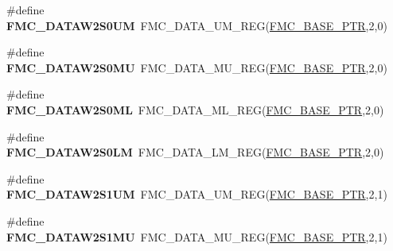 \begin{DoxyCompactItemize}
\item 
\hypertarget{group___f_m_c___register___accessor___macros_gac00fa366ca4f77e6f59ad9dde014c26d}{}\#define {\bfseries F\+M\+C\+\_\+\+D\+A\+T\+A\+W2\+S0\+U\+M}~F\+M\+C\+\_\+\+D\+A\+T\+A\+\_\+\+U\+M\+\_\+\+R\+E\+G(\hyperlink{group___f_m_c___peripheral_ga0a740437b573e32e6b932bf729485fd9}{F\+M\+C\+\_\+\+B\+A\+S\+E\+\_\+\+P\+T\+R},2,0)\label{group___f_m_c___register___accessor___macros_gac00fa366ca4f77e6f59ad9dde014c26d}

\item 
\hypertarget{group___f_m_c___register___accessor___macros_ga4e03f60fd7f774927f55089ee49acd8e}{}\#define {\bfseries F\+M\+C\+\_\+\+D\+A\+T\+A\+W2\+S0\+M\+U}~F\+M\+C\+\_\+\+D\+A\+T\+A\+\_\+\+M\+U\+\_\+\+R\+E\+G(\hyperlink{group___f_m_c___peripheral_ga0a740437b573e32e6b932bf729485fd9}{F\+M\+C\+\_\+\+B\+A\+S\+E\+\_\+\+P\+T\+R},2,0)\label{group___f_m_c___register___accessor___macros_ga4e03f60fd7f774927f55089ee49acd8e}

\item 
\hypertarget{group___f_m_c___register___accessor___macros_ga51ded89a0e3f06a4383d0d27815e0c63}{}\#define {\bfseries F\+M\+C\+\_\+\+D\+A\+T\+A\+W2\+S0\+M\+L}~F\+M\+C\+\_\+\+D\+A\+T\+A\+\_\+\+M\+L\+\_\+\+R\+E\+G(\hyperlink{group___f_m_c___peripheral_ga0a740437b573e32e6b932bf729485fd9}{F\+M\+C\+\_\+\+B\+A\+S\+E\+\_\+\+P\+T\+R},2,0)\label{group___f_m_c___register___accessor___macros_ga51ded89a0e3f06a4383d0d27815e0c63}

\item 
\hypertarget{group___f_m_c___register___accessor___macros_ga6d06a694a009c279a2468bdeaae89f9a}{}\#define {\bfseries F\+M\+C\+\_\+\+D\+A\+T\+A\+W2\+S0\+L\+M}~F\+M\+C\+\_\+\+D\+A\+T\+A\+\_\+\+L\+M\+\_\+\+R\+E\+G(\hyperlink{group___f_m_c___peripheral_ga0a740437b573e32e6b932bf729485fd9}{F\+M\+C\+\_\+\+B\+A\+S\+E\+\_\+\+P\+T\+R},2,0)\label{group___f_m_c___register___accessor___macros_ga6d06a694a009c279a2468bdeaae89f9a}

\item 
\hypertarget{group___f_m_c___register___accessor___macros_gae65011d2add3a4d4d7c3cf197d7429b4}{}\#define {\bfseries F\+M\+C\+\_\+\+D\+A\+T\+A\+W2\+S1\+U\+M}~F\+M\+C\+\_\+\+D\+A\+T\+A\+\_\+\+U\+M\+\_\+\+R\+E\+G(\hyperlink{group___f_m_c___peripheral_ga0a740437b573e32e6b932bf729485fd9}{F\+M\+C\+\_\+\+B\+A\+S\+E\+\_\+\+P\+T\+R},2,1)\label{group___f_m_c___register___accessor___macros_gae65011d2add3a4d4d7c3cf197d7429b4}

\item 
\hypertarget{group___f_m_c___register___accessor___macros_gaf1774bd2af301b6b5aecdef6d68eba34}{}\#define {\bfseries F\+M\+C\+\_\+\+D\+A\+T\+A\+W2\+S1\+M\+U}~F\+M\+C\+\_\+\+D\+A\+T\+A\+\_\+\+M\+U\+\_\+\+R\+E\+G(\hyperlink{group___f_m_c___peripheral_ga0a740437b573e32e6b932bf729485fd9}{F\+M\+C\+\_\+\+B\+A\+S\+E\+\_\+\+P\+T\+R},2,1)\label{group___f_m_c___register___accessor___macros_gaf1774bd2af301b6b5aecdef6d68eba34}


\end{DoxyCompactItemize}
